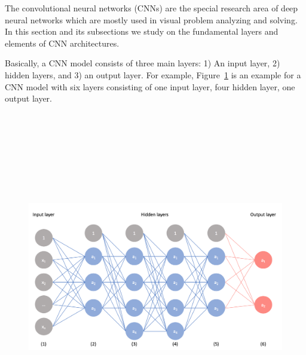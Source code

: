 The convolutional neural networks (CNNs) are the special research area of deep neural networks which are mostly used in visual problem analyzing and solving. In this section and its subsections we study on the fundamental layers and elements of CNN architectures. 

Basically, a CNN model consists of three main layers: 1) An input layer, 2) hidden layers, and 3) an output layer. For example, Figure~\ref{fig:basic_cnn_sample} is an example for a CNN model with six layers consisting of one input layer, four hidden layer, one output layer.


\begin{figure}[h]
	\centering
	\includegraphics[width=14.5cm,height=14.5cm,keepaspectratio]{fig/basic_cnn_sample.png}
	\vspace*{1mm}
	\label{fig:basic_cnn_sample}
\end{figure}


